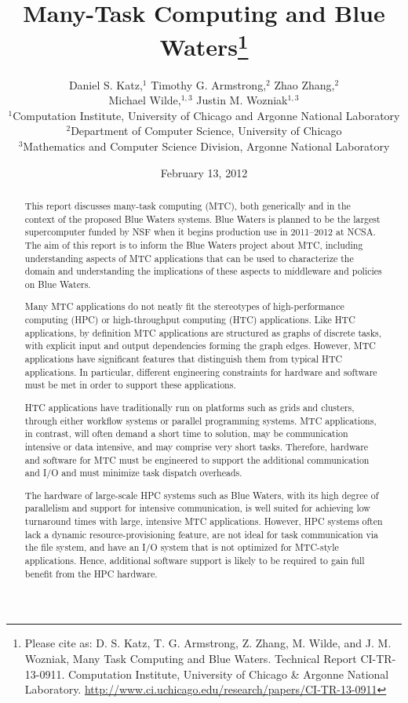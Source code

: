 \documentclass[10pt,letterpaper]{article}
\title{Many-Task Computing and Blue Waters\footnote{Please cite as: D. S. Katz, T. G. Armstrong, Z. Zhang, M. Wilde, and J. M. Wozniak,  Many Task Computing and Blue Waters. Technical Report CI-TR-13-0911. Computation Institute, University of Chicago \& Argonne National Laboratory. \url{http://www.ci.uchicago.edu/research/papers/CI-TR-13-0911}}}
\author{Daniel S. Katz,$^{1}$ Timothy G. Armstrong,$^{2}$ Zhao Zhang,$^{2}$\\
Michael Wilde,$^{1,3}$ Justin M. Wozniak$^{1,3}$\\
  \small $^1$Computation Institute,
  University of Chicago and Argonne National Laboratory\\[-0.2em]
  \small $^2$Department of Computer Science,
  University of Chicago\\[-0.2em]
  \small $^3$Mathematics and Computer Science Division,
  Argonne National Laboratory\\[-0.2em]
}
\date{February 13, 2012}
\begin{document}
\maketitle

\begin{abstract}
This report discusses many-task computing (MTC), both generically and
in the context of the proposed Blue Waters systems.  Blue Waters is planned to be the largest
supercomputer funded by NSF when
it begins production use in 2011--2012 at NCSA.
The aim of this report is to inform the Blue Waters project about MTC,
including understanding aspects of MTC applications that can be used to
characterize the domain and understanding the implications of these
aspects to middleware and policies on Blue Waters.

Many MTC applications do not neatly fit the stereotypes of
high-performance computing (HPC) or high-throughput computing (HTC)
applications.  Like HTC applications, by definition MTC applications
are structured as graphs of discrete tasks, with explicit input and output
dependencies forming the graph edges.  However, MTC applications have
significant features that distinguish them from typical HTC applications.
In particular, different engineering constraints for hardware and software must be
met in order to support these applications.

HTC applications have traditionally run on platforms such as grids and clusters,
through either workflow systems or parallel programming systems.
MTC applications, in contrast, will
often demand a short time to solution, may be communication intensive or
data intensive, and may comprise very short tasks.
Therefore, hardware and software for MTC must be engineered
to support the additional communication and I/O and must minimize
task dispatch overheads.

The hardware of large-scale HPC systems such as Blue Waters, with its high degree of
parallelism and support for intensive communication, is well suited
for achieving low turnaround times with large, intensive MTC applications.
However, HPC systems often lack a dynamic resource-provisioning
feature, are not ideal for task communication via the file system, and
have an I/O system that is not optimized for MTC-style applications. Hence,
additional software support is likely to be required to gain full benefit
from the HPC hardware.

\end{abstract}


\pagebreak
\end{document}
